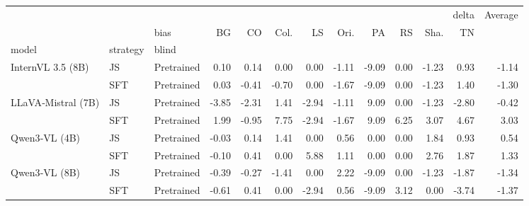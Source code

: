 \begin{tabular}{lllrrrrrrrrrr}
\toprule
 &  &  & \multicolumn{9}{r}{delta} & Average \\
 &  & bias & BG & CO & Col. & LS & Ori. & PA & RS & Sha. & TN &  \\
model & strategy & blind &  &  &  &  &  &  &  &  &  &  \\
\midrule
\multirow[t]{2}{*}{InternVL 3.5 (8B)} & JS & Pretrained & 0.10 & 0.14 & 0.00 & 0.00 & -1.11 & -9.09 & 0.00 & -1.23 & 0.93 & -1.14 \\
\cline{2-13}
 & SFT & Pretrained & 0.03 & -0.41 & -0.70 & 0.00 & -1.67 & -9.09 & 0.00 & -1.23 & 1.40 & -1.30 \\
\cline{1-13} \cline{2-13}
\multirow[t]{2}{*}{LLaVA‑Mistral (7B)} & JS & Pretrained & -3.85 & -2.31 & 1.41 & -2.94 & -1.11 & 9.09 & 0.00 & -1.23 & -2.80 & -0.42 \\
\cline{2-13}
 & SFT & Pretrained & 1.99 & -0.95 & 7.75 & -2.94 & -1.67 & 9.09 & 6.25 & 3.07 & 4.67 & 3.03 \\
\cline{1-13} \cline{2-13}
\multirow[t]{2}{*}{Qwen3‑VL (4B)} & JS & Pretrained & -0.03 & 0.14 & 1.41 & 0.00 & 0.56 & 0.00 & 0.00 & 1.84 & 0.93 & 0.54 \\
\cline{2-13}
 & SFT & Pretrained & -0.10 & 0.41 & 0.00 & 5.88 & 1.11 & 0.00 & 0.00 & 2.76 & 1.87 & 1.33 \\
\cline{1-13} \cline{2-13}
\multirow[t]{2}{*}{Qwen3‑VL (8B)} & JS & Pretrained & -0.39 & -0.27 & -1.41 & 0.00 & 2.22 & -9.09 & 0.00 & -1.23 & -1.87 & -1.34 \\
\cline{2-13}
 & SFT & Pretrained & -0.61 & 0.41 & 0.00 & -2.94 & 0.56 & -9.09 & 3.12 & 0.00 & -3.74 & -1.37 \\
\cline{1-13} \cline{2-13}
\bottomrule
\end{tabular}
